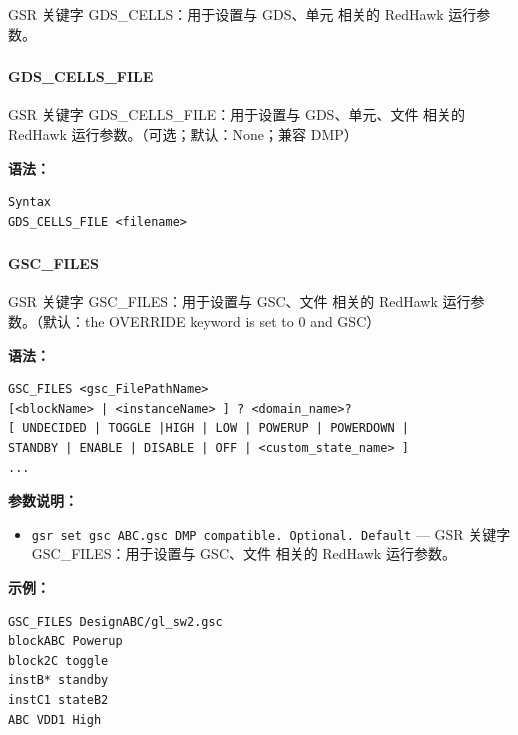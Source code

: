 GSR 关键字 GDS_CELLS：用于设置与 GDS、单元 相关的 RedHawk 运行参数。

\subsubsection{}
\paragraph*{GDS_CELLS_FILE}

GSR 关键字 GDS_CELLS_FILE：用于设置与 GDS、单元、文件 相关的 RedHawk 运行参数。（可选；默认：None；兼容 DMP）

\textbf{语法：}
\begin{lstlisting}
Syntax
GDS_CELLS_FILE <filename>
\end{lstlisting}

\subsubsection{}
\paragraph*{GSC_FILES}

GSR 关键字 GSC_FILES：用于设置与 GSC、文件 相关的 RedHawk 运行参数。（默认：the OVERRIDE keyword is set to 0 and GSC）

\textbf{语法：}
\begin{lstlisting}
GSC_FILES <gsc_FilePathName>
[<blockName> | <instanceName> ] ? <domain_name>?
[ UNDECIDED | TOGGLE |HIGH | LOW | POWERUP | POWERDOWN |
STANDBY | ENABLE | DISABLE | OFF | <custom_state_name> ]
...
\end{lstlisting}

\textbf{参数说明：}
\begin{itemize}
\item \texttt{gsr set gsc ABC.gsc DMP compatible. Optional. Default} — GSR 关键字 GSC\_FILES：用于设置与 GSC、文件 相关的 RedHawk 运行参数。
\end{itemize}

\textbf{示例：}
\begin{lstlisting}
GSC_FILES DesignABC/gl_sw2.gsc
blockABC Powerup
block2C toggle
instB* standby
instC1 stateB2
ABC VDD1 High
\end{lstlisting}

\subsubsection{}
